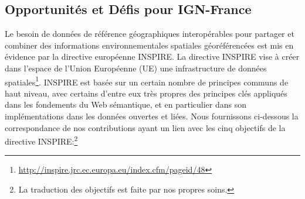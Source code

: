 \documentclass[a4paper,11pt,twoside]{report}
\begin{document}
\subsection*{Opportunités et Défis pour IGN-France}
\label{sec:challenges}


Le besoin de données de référence géographiques interopérables pour partager et combiner des informations environnementales spatiales géoréférencées est mis en évidence par la directive européenne INSPIRE. La directive INSPIRE vise à créer dans l'espace de l'Union Européenne (UE) une infrastructure de données spatiales\footnote{\url{http://inspire.jrc.ec.europa.eu/index.cfm/pageid/48}}. INSPIRE est basée sur un certain nombre de principes communs de haut niveau, avec certains d'entre eux très propres des principes clés appliqués dans les fondements du Web sémantique, et en particulier dans son implémentations dans les données ouvertes et liées. Nous fournissons ci-dessous la correspondance de nos contributions ayant un lien avec les cinq objectifs de la directive INSPIRE:\footnote{La traduction des objectifs est faite par nos propres soins.}
\end{document}
